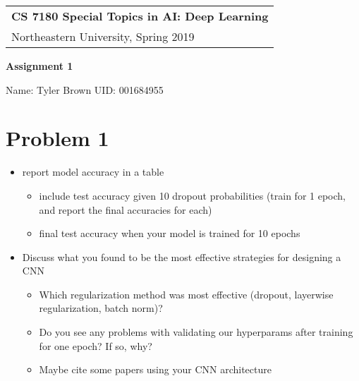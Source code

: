 \documentclass[a4paper,12pt]{article} %
\begin{document}
\thispagestyle{empty} %

\begin{tabular}{p{15.5cm}} %
{\large \bf CS 7180 Special Topics in AI: Deep Learning} \\
Northeastern University, Spring 2019 \\
\hline %
\end{tabular} %

\vspace*{0.3cm} %

\begin{center} %
    {\Large \bf Assignment 1} %
    \vspace{2mm}
    
    {Name: Tyler Brown UID: 001684955}
\end{center} 
%
\vspace{0.2cm}

\section{Problem 1}

\begin{itemize}
\item report model accuracy in a table
  \begin{itemize}
  \item include test accuracy given 10 dropout probabilities (train for
    1 epoch, and report the final accuracies for each)
  \item final test accuracy when your model is trained for 10 epochs
    \end{itemize}
\item Discuss what you found to be the most effective strategies for
  designing a CNN
  \begin{itemize}
  \item Which regularization method was most effective (dropout,
    layerwise regularization, batch norm)?
  \item Do you see any problems with validating our hyperparams after
    training for one epoch? If so, why?
  \item Maybe cite some papers using your CNN architecture
    \end{itemize}
  \end{itemize}
\end{document}
